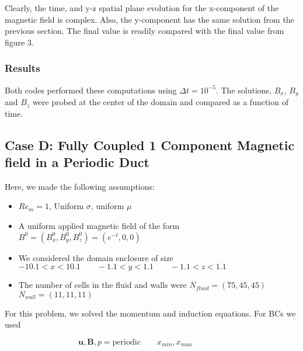 \documentclass[11pt]{article}
\newcommand{\figS}{22.1em}
\newcommand{\figH}{\figS}
\newcommand{\figW}{\figS}
\begin{document}
Clearly, the time, and y-z spatial plane evolution for the x-component of the magnetic field is complex. Also, the y-component has the same solution from the previous section. The final value is readily compared with the final value from figure 3.


\subsubsection{Results}
Both codes performed these computations using $\Delta t = 10^{-5}$. The solutions, $B_x$, $B_y$ and $B_z$ were probed at the center of the domain and compared as a function of time.

\begin{figure}[H]
 \centering
   \caption[Optional ]{}
\end{figure}

\begin{figure}[H]
 \centering
   \caption[Optional ]{}
\end{figure}

\subsection{Case D: Fully Coupled 1 Component Magnetic field in a Periodic Duct}

Here, we made the following assumptions:

\begin{itemize}
\item $Re_m = 1$, Uniform $\sigma$, uniform $\mu$
\item A uniform applied magnetic field of the form $B^0 = (B_x^0,B_y^0,B_z^0) = (e^{-t},0,0)$
\item We considered the domain enclosure of size $-10.1 < x < 10.1 \qquad -1.1 < y < 1.1 \qquad -1.1 < z < 1.1$
\item The number of cells in the fluid and walls were $N_{fluid} = (75,45,45)$ \qquad $N_{wall} = (11,11,11)$
\end{itemize}

For this problem, we solved the momentum and induction equations. For BCs we used

\begin{equation}
	\pmb{u},
	\pmb{B},
	p = \text{periodic}
	\qquad
	x_{min},x_{max}
	\qquad \qquad
\end{equation}
\end{document}
